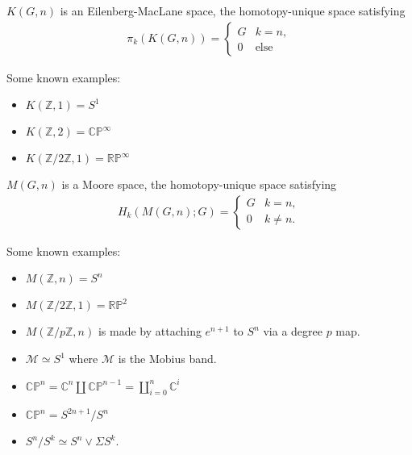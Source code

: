 \begin{example}

\(K(G, n)\) is an Eilenberg-MacLane space, the homotopy-unique space
satisfying
\begin{align*}
\pi_{k}(K(G, n)) = 
\begin{cases}
G & k=n, \\ 
0 & \text{else}
\end{cases}
\end{align*}

Some known examples:

\begin{itemize}
\tightlist
\item
  \(K({\mathbb{Z}}, 1) = S^1\)
\item
  \(K({\mathbb{Z}}, 2) = {\mathbb{CP}}^\infty\)
\item
  \(K({\mathbb{Z}}/2{\mathbb{Z}}, 1) = {\mathbb{RP}}^\infty\)
\end{itemize}

\end{example}

\begin{example}

\(M(G, n)\) is a Moore space, the homotopy-unique space satisfying
\begin{align*}
H_{k}(M(G, n); G) = 
\begin{cases}
G & k=n, \\ 
0 & k\neq n.
\end{cases}
\end{align*}

Some known examples:

\begin{itemize}
\tightlist
\item
  \(M({\mathbb{Z}}, n) = S^n\)
\item
  \(M({\mathbb{Z}}/2{\mathbb{Z}}, 1) = {\mathbb{RP}}^2\)
\item
  \(M({\mathbb{Z}}/p{\mathbb{Z}}, n)\) is made by attaching \(e^{n+1}\)
  to \(S^n\) via a degree \(p\) map.
\end{itemize}

\end{example}

\begin{fact}

\envlist

\begin{itemize}
\tightlist
\item
  \({\mathcal{M}}\simeq S^1\) where \({\mathcal{M}}\) is the Mobius
  band.
\item
  \({\mathbb{CP}}^n = {\mathbb{C}}^n \coprod {\mathbb{CP}}^{n-1} = \coprod_{i=0}^n {\mathbb{C}}^i\)
\item
  \({\mathbb{CP}}^n = S^{2n+1} / S^n\)
\item
  \(S^n / S^k \simeq S^n \vee \Sigma S^k\).
\end{itemize}

\end{fact}

